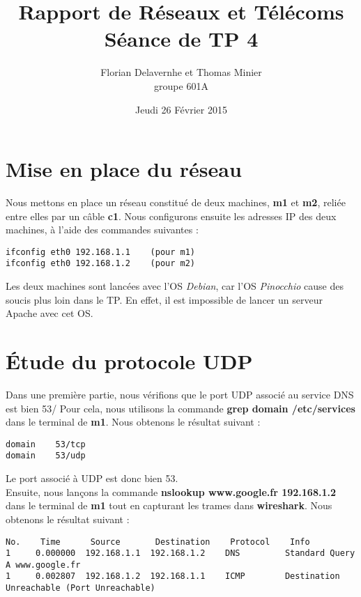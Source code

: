 \documentclass{article}
\title{Rapport de Réseaux et Télécoms \\ Séance de TP 4}
\author{Florian Delavernhe et Thomas Minier \\ groupe 601A}
\date{Jeudi 26 Février 2015}
\begin{document}
\maketitle
\vspace{5cm}
\tableofcontents
\newpage

\section{Mise en place du réseau}

Nous mettons en place un réseau constitué de deux machines, \textbf{m1} et \textbf{m2}, reliée entre elles par un câble \textbf{c1}. Nous configurons ensuite les adresses IP des deux machines, à l'aide des commandes suivantes :
\begin{verbatim}
ifconfig eth0 192.168.1.1    (pour m1)
ifconfig eth0 192.168.1.2    (pour m2)
\end{verbatim}

Les deux machines sont lancées avec l'OS \textit{Debian}, car l'OS \textit{Pinocchio} cause des soucis plus loin dans le TP. En effet, il est impossible de lancer un serveur Apache avec cet OS.

\section{Étude du protocole UDP}

Dans une première partie, nous vérifions que le port UDP associé au service DNS est bien 53/ Pour cela, nous utilisons la commande \textbf{grep domain /etc/services} dans le terminal de \textbf{m1}. Nous obtenons le résultat suivant :
\begin{verbatim}
domain    53/tcp
domain    53/udp
\end{verbatim}

Le port associé à UDP est donc bien 53. \\

Ensuite, nous lançons la commande \textbf{nslookup www.google.fr 192.168.1.2} dans le terminal de \textbf{m1} tout en capturant les trames dans \textbf{wireshark}. Nous obtenons le résultat suivant :
\begin{verbatim}
No.    Time      Source       Destination    Protocol    Info
1     0.000000  192.168.1.1  192.168.1.2    DNS         Standard Query A www.google.fr
1     0.002807  192.168.1.2  192.168.1.1    ICMP        Destination Unreachable (Port Unreachable)
\end{verbatim}
\end{document}
